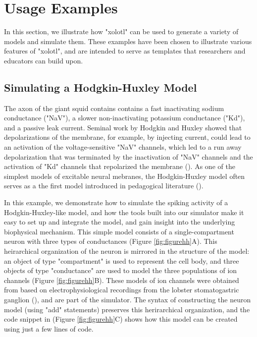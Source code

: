 \documentclass{frontiersSCNS} %
\begin{document}
%
%
%
%
%
%

\section{Usage Examples}
\label{usage}

In this section, we illustrate how "xolotl" can be used to generate a variety of models and simulate them. These examples have been chosen to illustrate various features of "xolotl", and are intended to serve as templates that researchers and educators can build upon.

%
%
%
%
%
%

\subsection{Simulating a Hodgkin-Huxley Model}

The axon of the giant squid contains contains a fast inactivating sodium conductance ("NaV"), a slower non-inactivating potassium conductance ("Kd"), and a passive leak current. Seminal work by Hodgkin and Huxley showed that depolarizations of the membrane, for example, by injecting current, could lead to an activation of the voltage-sensitive "NaV" channels, which led to a run away depolarization that was terminated by the inactivation of "NaV" channels and the activation of "Kd" channels that repolarized the membrane (\cite{hodgkinComponentsMembraneConductance1952, hodgkinMeasurementCurrentvoltageRelations1952}). As one of the simplest models of excitable neural mebranes, the Hodgkin-Huxley model often serves as a the first model introduced in pedagogical literature (\cite{dayanTheoreticalNeuroscience2001, sterrattPrinciplesComputationalModelling2011, trappenbergFundamentalsComputationalNeuroscience2010}).  


In this example, we demonstrate how to simulate the spiking activity of a Hodgkin-Huxley-like model, and how the tools built into our simulator make it easy to set up and integrate the model, and gain insight into the underlying biophysical mechanism. This simple model consists of a single-compartment neuron with three types of conductances  (Figure \ref{fig:figurehh}A). This heirarchical organization of the neuron is mirrored in the structure of the model: an object of type "compartment" is used to represent the cell body, and three objects of type "conductance" are used to model the three populations of ion channels (Figure \ref{fig:figurehh}B). These models of ion channels were obtained from \cite{liuModelNeuronActivitydependent1998} based on electrophysiological recordings from the lobster stomatogastric ganglion (\cite{turrigianoSelectiveRegulationCurrent1995}), and are part of the simulator. The syntax of constructing the neuron model (using "add" statements) preserves this herirarchical organization, and the code snippet in (Figure \ref{fig:figurehh}C) shows how this model can be created using just a few lines of code. 
\end{document}
